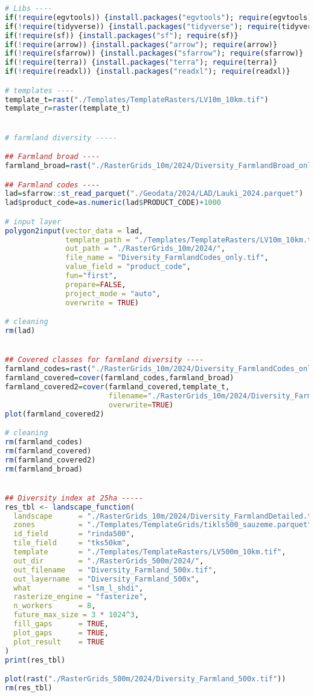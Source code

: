 \documentclass[
]{book}
\begin{document}
\begin{lstlisting}[language=R]
# Libs ----
if(!require(egvtools)) {install.packages("egvtools"); require(egvtools)}
if(!require(tidyverse)) {install.packages("tidyverse"); require(tidyverse)}
if(!require(sf)) {install.packages("sf"); require(sf)}
if(!require(arrow)) {install.packages("arrow"); require(arrow)}
if(!require(sfarrow)) {install.packages("sfarrow"); require(sfarrow)}
if(!require(terra)) {install.packages("terra"); require(terra)}
if(!require(readxl)) {install.packages("readxl"); require(readxl)}

# templates ----
template_t=rast("./Templates/TemplateRasters/LV10m_10km.tif")
template_r=raster(template_t)


# farmland diversity -----

## Farmland broad ----
farmland_broad=rast("./RasterGrids_10m/2024/Diversity_FarmlandBroad_only.tif")

## Farmland codes ----
lad=sfarrow::st_read_parquet("./Geodata/2024/LAD/Lauki_2024.parquet")
lad$product_code=as.numeric(lad$PRODUCT_CODE)+1000

# input layer
polygon2input(vector_data = lad,
              template_path = "./Templates/TemplateRasters/LV10m_10km.tif",
              out_path = "./RasterGrids_10m/2024/",
              file_name = "Diversity_FarmlandCodes_only.tif",
              value_field = "product_code",
              fun="first",
              prepare=FALSE,
              project_mode = "auto",
              overwrite = TRUE)

# cleaning
rm(lad)


## Covered classes for farmland diversity ----
farmland_codes=rast("./RasterGrids_10m/2024/Diversity_FarmlandCodes_only.tif")
farmland_covered=cover(farmland_codes,farmland_broad)
farmland_covered2=cover(farmland_covered,template_t,
                        filename="./RasterGrids_10m/2024/Diversity_FarmlandDetailed.tif",
                        overwrite=TRUE)
plot(farmland_covered2)

# cleaning
rm(farmland_codes)
rm(farmland_covered)
rm(farmland_covered2)
rm(farmland_broad)


## Diversity index at 25ha -----
res_tbl <- landscape_function(
  landscape      = "./RasterGrids_10m/2024/Diversity_FarmlandDetailed.tif",
  zones          = "./Templates/TemplateGrids/tikls500_sauzeme.parquet",
  id_field       = "rinda500",
  tile_field     = "tks50km",
  template       = "./Templates/TemplateRasters/LV500m_10km.tif",
  out_dir        = "./RasterGrids_500m/2024/",
  out_filename   = "Diversity_Farmland_500x.tif",
  out_layername  = "Diversity_Farmland_500x",
  what           = "lsm_l_shdi",
  rasterize_engine = "fasterize",
  n_workers      = 8,
  future_max_size = 3 * 1024^3,
  fill_gaps      = TRUE,
  plot_gaps      = TRUE,
  plot_result    = TRUE
)
print(res_tbl)

plot(rast("./RasterGrids_500m/2024/Diversity_Farmland_500x.tif"))
rm(res_tbl)
\end{lstlisting}
\end{document}
